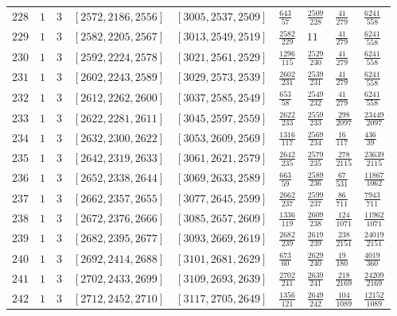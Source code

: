 \documentclass[12pt]{extarticle}
\begin{document}
\begin{longtable}{lllllllll}
$228$ & $1$ & $3$ & $\left[2572, 2186, 2556\right]$ & $\left[3005, 2537, 2509\right]$ & $\frac{643}{57}$ & $\frac{2509}{228}$ & $\frac{41}{279}$ & $\frac{6241}{558}$ \\
$229$ & $1$ & $3$ & $\left[2582, 2205, 2567\right]$ & $\left[3013, 2549, 2519\right]$ & $\frac{2582}{229}$ & $11$ & $\frac{41}{279}$ & $\frac{6241}{558}$ \\
$230$ & $1$ & $3$ & $\left[2592, 2224, 2578\right]$ & $\left[3021, 2561, 2529\right]$ & $\frac{1296}{115}$ & $\frac{2529}{230}$ & $\frac{41}{279}$ & $\frac{6241}{558}$ \\
$231$ & $1$ & $3$ & $\left[2602, 2243, 2589\right]$ & $\left[3029, 2573, 2539\right]$ & $\frac{2602}{231}$ & $\frac{2539}{231}$ & $\frac{41}{279}$ & $\frac{6241}{558}$ \\
$232$ & $1$ & $3$ & $\left[2612, 2262, 2600\right]$ & $\left[3037, 2585, 2549\right]$ & $\frac{653}{58}$ & $\frac{2549}{232}$ & $\frac{41}{279}$ & $\frac{6241}{558}$ \\
$233$ & $1$ & $3$ & $\left[2622, 2281, 2611\right]$ & $\left[3045, 2597, 2559\right]$ & $\frac{2622}{233}$ & $\frac{2559}{233}$ & $\frac{298}{2097}$ & $\frac{23449}{2097}$ \\
$234$ & $1$ & $3$ & $\left[2632, 2300, 2622\right]$ & $\left[3053, 2609, 2569\right]$ & $\frac{1316}{117}$ & $\frac{2569}{234}$ & $\frac{16}{117}$ & $\frac{436}{39}$ \\
$235$ & $1$ & $3$ & $\left[2642, 2319, 2633\right]$ & $\left[3061, 2621, 2579\right]$ & $\frac{2642}{235}$ & $\frac{2579}{235}$ & $\frac{278}{2115}$ & $\frac{23639}{2115}$ \\
$236$ & $1$ & $3$ & $\left[2652, 2338, 2644\right]$ & $\left[3069, 2633, 2589\right]$ & $\frac{663}{59}$ & $\frac{2589}{236}$ & $\frac{67}{531}$ & $\frac{11867}{1062}$ \\
$237$ & $1$ & $3$ & $\left[2662, 2357, 2655\right]$ & $\left[3077, 2645, 2599\right]$ & $\frac{2662}{237}$ & $\frac{2599}{237}$ & $\frac{86}{711}$ & $\frac{7943}{711}$ \\
$238$ & $1$ & $3$ & $\left[2672, 2376, 2666\right]$ & $\left[3085, 2657, 2609\right]$ & $\frac{1336}{119}$ & $\frac{2609}{238}$ & $\frac{124}{1071}$ & $\frac{11962}{1071}$ \\
$239$ & $1$ & $3$ & $\left[2682, 2395, 2677\right]$ & $\left[3093, 2669, 2619\right]$ & $\frac{2682}{239}$ & $\frac{2619}{239}$ & $\frac{238}{2151}$ & $\frac{24019}{2151}$ \\
$240$ & $1$ & $3$ & $\left[2692, 2414, 2688\right]$ & $\left[3101, 2681, 2629\right]$ & $\frac{673}{60}$ & $\frac{2629}{240}$ & $\frac{19}{180}$ & $\frac{4019}{360}$ \\
$241$ & $1$ & $3$ & $\left[2702, 2433, 2699\right]$ & $\left[3109, 2693, 2639\right]$ & $\frac{2702}{241}$ & $\frac{2639}{241}$ & $\frac{218}{2169}$ & $\frac{24209}{2169}$ \\
$242$ & $1$ & $3$ & $\left[2712, 2452, 2710\right]$ & $\left[3117, 2705, 2649\right]$ & $\frac{1356}{121}$ & $\frac{2649}{242}$ & $\frac{104}{1089}$ & $\frac{12152}{1089}$ \\
\end{longtable}
\end{document}

